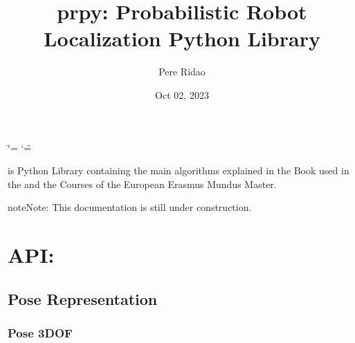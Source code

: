 \documentclass[letterpaper,10pt,english]{sphinxmanual}
\title{prpy: Probabilistic Robot Localization Python Library}
\date{Oct 02, 2023}
\author{Pere Ridao}
\begin{document}
\ifdefined\shorthandoff
  \ifnum\catcode`\=\string=\active\shorthandoff{=}\fi
  \ifnum\catcode`\"=\active{}\fi
\fi

\pagestyle{empty}
\sphinxmaketitle
\pagestyle{plain}
\sphinxtableofcontents
\pagestyle{normal}
\label{\detokenize{index::doc}}


\sphinxAtStartPar
{} is Python Library containing the main algorithms explained in the  Book used in the  and the  Courses of the  European Erasmus Mundus Master.

\begin{sphinxadmonition}{note}{Note:}
\sphinxAtStartPar
This documentation is still under construction.
\end{sphinxadmonition}


\chapter{API:}
\label{\detokenize{index:api}}
\sphinxstepscope


\section{Pose Representation}
\label{\detokenize{compounding:pose-representation}}\label{\detokenize{compounding::doc}}

\subsection{Pose 3DOF}
\label{\detokenize{compounding:pose-3dof}}
\end{document}
